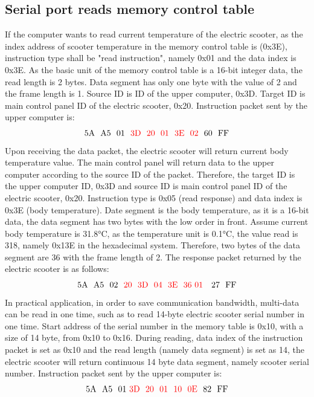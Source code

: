 \documentclass[binding=0.6cm,LaM,noexaminfo]{sapthesis}
\begin{document}
\subsection{Serial port reads memory control table}
If the computer wants to read current temperature of the electric scooter, as the index address of scooter temperature in the memory control table is (0x3E), instruction type shall be "read instruction", namely 0x01 and the data index is 0x3E. As the basic unit of the memory control table is a 16-bit integer data, the read length is 2 bytes. Data segment has only one byte with the value of 2 and the frame length is 1. Source ID is ID of the upper computer, 0x3D. Target ID is main control panel ID of the electric scooter, 0x20. Instruction packet sent by the upper computer is:
\begin{equation*}
    \text{5A \ A5 \ 01 \ \textcolor{red}{3D \ 20 \ 01 \ 3E \ 02} \ 60 \ FF}
\end{equation*}
Upon receiving the data packet, the electric scooter will return current body temperature value. The main control panel will return data to the upper computer according to the source ID of the packet. Therefore, the target ID is the upper computer ID, 0x3D and source ID is main control panel ID of the electric scooter, 0x20. Instruction type is 0x05 (read response) and data index is 0x3E (body temperature). Date segment is the body temperature, as it is a 16-bit data, the data segment has two bytes with the low order in front. Assume current body temperature is 31.8°C, as the temperature unit is 0.1°C, the value read is 318, namely 0x13E in the hexadecimal system. Therefore, two bytes of the data segment are 36  with the frame length of 2. The response packet returned by the electric scooter is as follows:
\begin{equation*}
    \text{5A \ A5 \ 02 \ \textcolor{red}{20 \ 3D \ 04 \ 3E \ 36\ 01 \ } 27 \ FF}
\end{equation*}
In practical application, in order to save communication bandwidth, multi-data can be read in one time, such as to read 14-byte electric scooter serial number in one time. Start address of the serial number in the memory table is 0x10, with a size of 14 byte, from 0x10 to 0x16. During reading, data index of the instruction packet is set as 0x10 and the read length (namely data segment) is set as 14, the electric scooter will return continuous 14 byte data segment, namely scooter serial number. Instruction packet sent by the upper computer is:
\begin{equation*}
    \text{5A \ A5 \ 01 \textcolor{red}{3D \ 20 \ 01 \ 10 \ 0E } 82 \ FF}    
\end{equation*}
\end{document}
